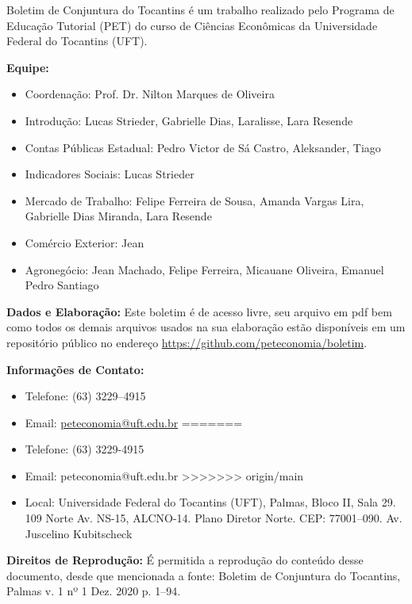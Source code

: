 \begin{tcolorbox}[colback=boxbackground, colframe=boxbackground, arc=0mm, top=15pt]
Boletim de Conjuntura do Tocantins é um trabalho realizado pelo Programa de Educação Tutorial (PET) do curso de Ciências Econômicas da Universidade Federal do Tocantins (UFT).
\\
\par{\bf Equipe:}
\begin{itemize}
	\item{Coordenação:} Prof. Dr. Nilton Marques de Oliveira
	\item{Introdução:} Lucas Strieder, Gabrielle Dias, Laralisse, Lara Resende
	\item{Contas Públicas Estadual:} Pedro Victor de Sá Castro, Aleksander, Tiago
	\item{Indicadores Sociais:} Lucas Strieder
	\item{Mercado de Trabalho:} Felipe Ferreira de Sousa, Amanda Vargas Lira, Gabrielle Dias Miranda, Lara Resende
	\item{Comércio Exterior:} Jean
	\item{Agronegócio:} Jean Machado, Felipe Ferreira, Micauane Oliveira, Emanuel Pedro Santiago
\end{itemize}
\par{\bf Dados e Elaboração:}
Este boletim é de acesso livre, seu arquivo em pdf bem como todos os demais arquivos usados na sua elaboração estão disponíveis em um repositório público no endereço \url{https://github.com/peteconomia/boletim}.
\\
\par{\bf Informações de Contato:}
\begin{itemize}
<<<<<<< HEAD
	\item{Telefone:} (63) 3229--4915
	\item{Email:} \url{peteconomia@uft.edu.br}
=======
	\item{Telefone:} (63) 3229-4915
	\item{Email: peteconomia@uft.edu.br} 
>>>>>>> origin/main
	\item{Local:} Universidade Federal do Tocantins (UFT), Palmas, Bloco II, Sala 29. 109 Norte Av. NS-15, ALCNO-14. Plano Diretor Norte. CEP: 77001--090. Av. Juscelino Kubitscheck
\end{itemize}
\par{\bf Direitos de Reprodução:}
É permitida a reprodução do conteúdo desse documento, desde que mencionada a fonte: Boletim de Conjuntura do Tocantins, Palmas v. 1 nº 1 Dez. 2020 p. 1--94.
\end{tcolorbox}